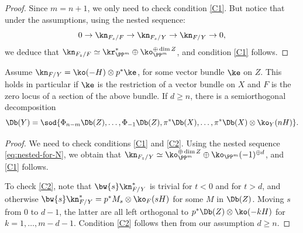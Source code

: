 \begin{proof}
Since $m=n+1$, we only need to check condition \eqref{C1}. But notice that under the assumptions,
using the nested sequence:
\begin{equation}\label{eq:nested-for-N}
0 \to \kn_{F_z/F} \to \kn_{F_z/Y} \to \kn_{F/Y} \to 0,
\end{equation}
we deduce that $\kn_{F_z/F} \simeq \kr^*_{\PP^m} \oplus \ko_{\PP^m}^{\oplus \dim Z}$, and
condition \eqref{C1} follows.
\end{proof}

\begin{cor}
Assume $\kn_{F/Y} = \ko(-H) \otimes p^* \ke$, for some vector bundle $\ke$ on $Z$. This
holds in particular if $\ke$ is the restriction of a vector bundle on $X$ and $F$ is the
zero locus of a section of the above bundle. If $d \geq n$, there is a semiorthogonal
decomposition
\[
\Db(Y)=\sod{\Phi_{n-m}\Db(Z),\ldots,\Phi_{-1}\Db(Z),\pi^*\Db(X),\ldots,\pi^*\Db(X)\otimes \ko_Y(nH)}.
\]
\end{cor}

\begin{proof}
We need to check conditions \eqref{C1} and \eqref{C2}.
Using the nested sequence \eqref{eq:nested-for-N}, we obtain that
$\kn_{F_z/Y} \simeq \ko_{\PP^m}^{\oplus \dim Z} \oplus \ko_{\PP^m}(-1)^{\oplus d}$, and
\eqref{C1} follows.

To check \eqref{C2}, note that $\bw{s} \kn_{F/Y}^*$ is trivial for $t<0$ and for $t>d$, and otherwise
$\bw{s} \kn_{F/Y}^*=p^*M_s \otimes \ko_F(sH)$ for some $M$ in $\Db(Z)$.
Moving $s$ from $0$ to $d-1$, the latter are all left orthogonal to $p^*\Db(Z)\otimes\ko(-kH)$ for
$k=1,\ldots,m-d-1$. Condition \eqref{C2} follows then from our assumption $d \geq n$.
\end{proof}

\Changelback
\backmatter
